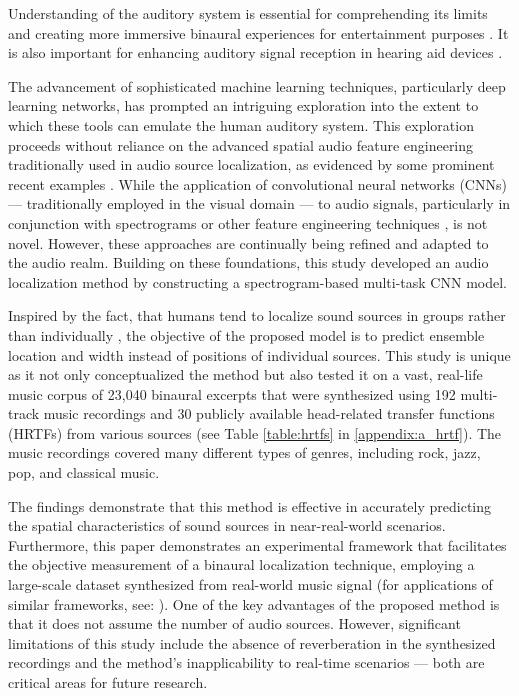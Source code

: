 \documentclass{article}
\begin{document}
Understanding of the auditory system is essential for comprehending its limits and creating more immersive binaural experiences for entertainment purposes \parencite{zhang_surround_2017}. It is also important for enhancing auditory signal reception in hearing aid devices \parencite{hirsh_binaural_1950, thiemann_speech_2016}.

The advancement of sophisticated machine learning techniques, particularly deep learning networks, has prompted an intriguing exploration into the extent to which these tools can emulate the human auditory system. This exploration proceeds without reliance on the advanced spatial audio feature engineering traditionally used in audio source localization, as evidenced by some prominent recent examples \parencite{yang_deepear_2022, vera-diaz_towards_2018, pang_multitask_2019}. While the application of convolutional neural networks (CNNs) \parencite{lecun_handwritten_1989} --- traditionally employed in the visual domain --- to audio signals, particularly in conjunction with spectrograms \parencite{thomas_analyzing_2014, espi_exploiting_2015, han_convolutional_2017} or other feature engineering techniques \parencite{abdel-hamid_applying_2012, sainath_deep_2013}, is not novel. However, these approaches are continually being refined and adapted to the audio realm. Building on these foundations, this study developed an audio localization method by constructing a spectrogram-based multi-task CNN model.

Inspired by the fact, that humans tend to localize sound sources in groups rather than individually \parencite{bregman_auditory_1990, rumsey_spatial_2002}, the objective of the proposed model is to predict ensemble location and width instead of positions of individual sources. This study is unique as it not only conceptualized the method but also tested it on a vast, real-life music corpus of 23,040 binaural excerpts that were synthesized using 192 multi-track music recordings \parencite{senior_mixing_2023} and 30 publicly available head-related transfer functions (HRTFs) from various sources (see Table \ref{table:hrtfs} in \ref{appendix:a_hrtf}). The music recordings covered many different types of genres, including rock, jazz, pop, and classical music.

The findings demonstrate that this method is effective in accurately predicting the spatial characteristics of sound sources in near-real-world scenarios. Furthermore, this paper demonstrates an experimental framework that facilitates the objective measurement of a binaural localization technique, employing a large-scale dataset synthesized from real-world music signal (for applications of similar frameworks, see: \cite{antoniuk_blind_2023, zielinski_automatic_2022, zielinski_spatial_2022, zielinski_comparison_2020}). One of the key advantages of the proposed method is that it does not assume the number of audio sources. However, significant limitations of this study include the absence of reverberation in the synthesized recordings and the method's inapplicability to real-time scenarios --- both are critical areas for future research.
\end{document}
